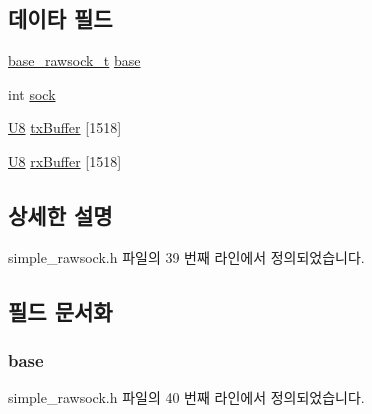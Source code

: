 \subsection*{데이타 필드}
\begin{DoxyCompactItemize}
\item 
\hyperlink{rawsock__impl_8h_ac539cdabcfe438f13001a289f222e6a2}{base\+\_\+rawsock\+\_\+t} \hyperlink{structsimple__rawsock__t_a1507c5af4508d59cb0a730a852763e94}{base}
\item 
int \hyperlink{structsimple__rawsock__t_a5903d0b282fc5eae503de618f896b5e1}{sock}
\item 
\hyperlink{openavb__types__base__pub_8h_aa63ef7b996d5487ce35a5a66601f3e73}{U8} \hyperlink{structsimple__rawsock__t_a7661fa3516bae1bdfe2000e2dea164ae}{tx\+Buffer} \mbox{[}1518\mbox{]}
\item 
\hyperlink{openavb__types__base__pub_8h_aa63ef7b996d5487ce35a5a66601f3e73}{U8} \hyperlink{structsimple__rawsock__t_a60a36f98faf9efc0f3447c6014c822ce}{rx\+Buffer} \mbox{[}1518\mbox{]}
\end{DoxyCompactItemize}


\subsection{상세한 설명}


simple\+\_\+rawsock.\+h 파일의 39 번째 라인에서 정의되었습니다.



\subsection{필드 문서화}
\subsubsection[{\texorpdfstring{base}{base}}]{ base}\hypertarget{structsimple__rawsock__t_a1507c5af4508d59cb0a730a852763e94}{}\label{structsimple__rawsock__t_a1507c5af4508d59cb0a730a852763e94}


simple\+\_\+rawsock.\+h 파일의 40 번째 라인에서 정의되었습니다.

